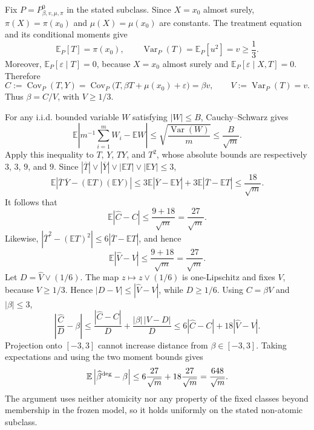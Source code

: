 Fix \(P=P^0_{\beta,v,\mu,\pi}\) in the stated subclass. Since \(X=x_0\) almost surely, \(\pi(X)=\pi(x_0)\) and \(\mu(X)=\mu(x_0)\) are constants. The treatment equation and its conditional moments give
\[
\mathbb E_P[T]=\pi(x_0),\qquad \operatorname{Var}_P(T)=\mathbb E_P[u^2]=v\ge\frac13.
\]
Moreover, \(\mathbb E_P[\varepsilon\mid T]=0\), because \(X=x_0\) almost surely and \(\mathbb E_P[\varepsilon\mid X,T]=0\). Therefore
\[
C:=\operatorname{Cov}_P(T,Y)
=\operatorname{Cov}_P\bigl(T,\beta T+\mu(x_0)+\varepsilon\bigr)
=\beta v,
\qquad V:=\operatorname{Var}_P(T)=v.
\]
Thus \(\beta=C/V\), with \(V\ge1/3\).

For any i.i.d. bounded variable \(W\) satisfying \(|W|\le B\), Cauchy--Schwarz gives
\[
\mathbb E\left|m^{-1}\sum_{i=1}^mW_i-\mathbb E W\right|
\le \sqrt{\frac{\operatorname{Var}(W)}m}
\le \frac{B}{\sqrt m}.
\]
Apply this inequality to \(T\), \(Y\), \(TY\), and \(T^2\), whose absolute bounds are respectively \(3\), \(3\), \(9\), and \(9\). Since \(|\overline T|\vee|\overline Y|\vee|\mathbb E T|\vee|\mathbb E Y|\le3\),
\[
\mathbb E\left|\overline T\,\overline Y-(\mathbb E T)(\mathbb E Y)\right|
\le3\mathbb E|\overline Y-\mathbb E Y|+3\mathbb E|\overline T-\mathbb E T|
\le\frac{18}{\sqrt m}.
\]
It follows that
\[
\mathbb E|\widehat C-C|\le\frac{9+18}{\sqrt m}=\frac{27}{\sqrt m}.
\]
Likewise, \(|\overline T^2-(\mathbb E T)^2|\le6|\overline T-\mathbb E T|\), and hence
\[
\mathbb E|\widehat V-V|\le\frac{9+18}{\sqrt m}=\frac{27}{\sqrt m}.
\]
Let \(D=\widehat V\vee(1/6)\). The map \(z\mapsto z\vee(1/6)\) is one-Lipschitz and fixes \(V\), because \(V\ge1/3\). Hence \(|D-V|\le|\widehat V-V|\), while \(D\ge1/6\). Using \(C=\beta V\) and \(|\beta|\le3\),
\[
\left|\frac{\widehat C}{D}-\beta\right|
\le \frac{|\widehat C-C|}{D}+\frac{|\beta|\,|V-D|}{D}
\le6|\widehat C-C|+18|\widehat V-V|.
\]
Projection onto \([-3,3]\) cannot increase distance from \(\beta\in[-3,3]\). Taking expectations and using the two moment bounds gives
\[
\mathbb E\left|\widehat\beta^{\rm deg}-\beta\right|
\le6\frac{27}{\sqrt m}+18\frac{27}{\sqrt m}
=\frac{648}{\sqrt m}.
\]
The argument uses neither atomicity nor any property of the fixed classes beyond membership in the frozen model, so it holds uniformly on the stated non-atomic subclass.
